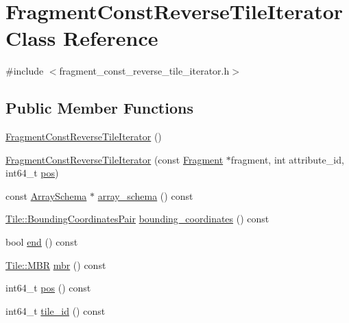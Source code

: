 \hypertarget{classFragmentConstReverseTileIterator}{}\section{Fragment\+Const\+Reverse\+Tile\+Iterator Class Reference}
\label{classFragmentConstReverseTileIterator}


{\ttfamily \#include $<$fragment\+\_\+const\+\_\+reverse\+\_\+tile\+\_\+iterator.\+h$>$}

\subsection*{Public Member Functions}
\begin{DoxyCompactItemize}
\item 
\hyperlink{classFragmentConstReverseTileIterator_a3f47f3d24a5fb80a975f84fc50c82ce8}{Fragment\+Const\+Reverse\+Tile\+Iterator} ()
\item 
\hyperlink{classFragmentConstReverseTileIterator_aeb0d75d5329d735634935706dc05904f}{Fragment\+Const\+Reverse\+Tile\+Iterator} (const \hyperlink{classFragment}{Fragment} $\ast$fragment, int attribute\+\_\+id, int64\+\_\+t \hyperlink{classFragmentConstReverseTileIterator_abad807b99461a41a4f2da64592eed4d9}{pos})
\item 
const \hyperlink{classArraySchema}{Array\+Schema} $\ast$ \hyperlink{classFragmentConstReverseTileIterator_aaf08ff57920e114770c01daf7cc1acc9}{array\+\_\+schema} () const 
\item 
\hyperlink{classTile_a7103069b7ba05d1032733e3a026b8632}{Tile\+::\+Bounding\+Coordinates\+Pair} \hyperlink{classFragmentConstReverseTileIterator_a436dc8c4f7913b1189d0a4705d20f402}{bounding\+\_\+coordinates} () const 
\item 
bool \hyperlink{classFragmentConstReverseTileIterator_a029735dfa3284389c3b9fc83cef1462c}{end} () const 
\item 
\hyperlink{classTile_a0b0f911c937d339ce110c18a2d015a4d}{Tile\+::\+M\+B\+R} \hyperlink{classFragmentConstReverseTileIterator_ab574fee534d970f151ae306a01ed480a}{mbr} () const 
\item 
int64\+\_\+t \hyperlink{classFragmentConstReverseTileIterator_abad807b99461a41a4f2da64592eed4d9}{pos} () const 
\item 
int64\+\_\+t \hyperlink{classFragmentConstReverseTileIterator_a1d8bb60cc4f1a524eb470f0892a94c5f}{tile\+\_\+id} () const 
\item 

\end{DoxyCompactItemize}
